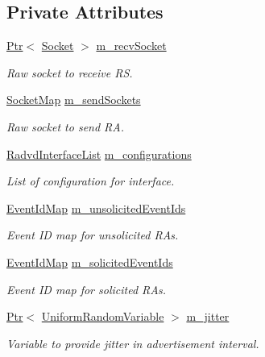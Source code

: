 \subsection*{Private Attributes}
\begin{DoxyCompactItemize}
\item 
\hyperlink{classns3_1_1Ptr}{Ptr}$<$ \hyperlink{classns3_1_1Socket}{Socket} $>$ \hyperlink{classns3_1_1Radvd_a6449329450cd38a098db2cf2cb91d64e}{m\+\_\+recv\+Socket}
\begin{DoxyCompactList}\small\item\em Raw socket to receive RS. \end{DoxyCompactList}\item 
\hyperlink{classns3_1_1Radvd_a58b325c83c73d2054a896868cc2f5d7b}{Socket\+Map} \hyperlink{classns3_1_1Radvd_ab0bd7a7d72f1ec0909ec447bcdf4788e}{m\+\_\+send\+Sockets}
\begin{DoxyCompactList}\small\item\em Raw socket to send RA. \end{DoxyCompactList}\item 
\hyperlink{classns3_1_1Radvd_a86074d8cb8e7395c05eb5c73046c5adc}{Radvd\+Interface\+List} \hyperlink{classns3_1_1Radvd_ad47ced3406790e0b78b5b141e0568aa9}{m\+\_\+configurations}
\begin{DoxyCompactList}\small\item\em List of configuration for interface. \end{DoxyCompactList}\item 
\hyperlink{classns3_1_1Radvd_a0632ec911bbb504e6adfdb0cb39b3d21}{Event\+Id\+Map} \hyperlink{classns3_1_1Radvd_aa214a58cd8ed1b693a177e9611b88177}{m\+\_\+unsolicited\+Event\+Ids}
\begin{DoxyCompactList}\small\item\em Event ID map for unsolicited R\+As. \end{DoxyCompactList}\item 
\hyperlink{classns3_1_1Radvd_a0632ec911bbb504e6adfdb0cb39b3d21}{Event\+Id\+Map} \hyperlink{classns3_1_1Radvd_a135124427566b60ccc12b6b93e708484}{m\+\_\+solicited\+Event\+Ids}
\begin{DoxyCompactList}\small\item\em Event ID map for solicited R\+As. \end{DoxyCompactList}\item 
\hyperlink{classns3_1_1Ptr}{Ptr}$<$ \hyperlink{classns3_1_1UniformRandomVariable}{Uniform\+Random\+Variable} $>$ \hyperlink{classns3_1_1Radvd_a14f71f3c45656a0280d512cb1b148839}{m\+\_\+jitter}
\begin{DoxyCompactList}\small\item\em Variable to provide jitter in advertisement interval. \end{DoxyCompactList}\end{DoxyCompactItemize}
